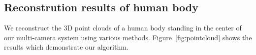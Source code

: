 \documentclass{article}
\begin{document}
\subsection{Reconstrution results of human body}
We reconstruct the 3D point clouds of a human body standing in the center of our multi-camera system using various methods. Figure~\ref{fig:pointcloud} shows the results which demonstrate our algorithm.
\begin{figure}[ht]
  \centering
{}%
\end{figure}
\end{document}
